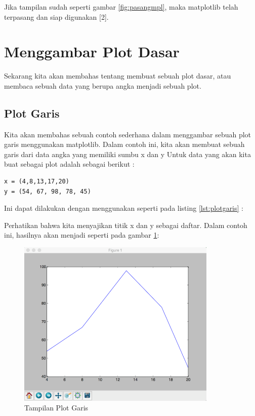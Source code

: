 Jika tampilan sudah seperti gambar \ref{fig:pasangmpl}, maka matplotlib telah terpasang dan siap digunakan [2].

\section{Menggambar Plot Dasar}
Sekarang kita akan membahas tentang membuat sebuah plot dasar, atau membaca sebuah data yang berupa angka menjadi sebuah plot.
\subsection{Plot Garis}
Kita akan membahas sebuah contoh sederhana dalam menggambar sebuah plot garis menggunakan matplotlib. Dalam contoh ini, kita akan membuat sebuah garis dari data angka yang memiliki sumbu x dan y
Untuk data yang akan kita buat sebagai plot adalah sebagai berikut : 
\begin{verbatim}
x = (4,8,13,17,20)
y = (54, 67, 98, 78, 45)
\end{verbatim}

Ini dapat dilakukan dengan menggunakan seperti pada listing \ref{lst:plotgaris} : 

Perhatikan bahwa kita menyajikan titik x dan y sebagai daftar.
Dalam contoh ini, hasilnya akan menjadi seperti pada gambar \ref{fig:plotgaris}:
\begin{figure}[!htbp]
	\centerline{\includegraphics[width=0.85\textwidth]{figures/6/plotgaris.PNG}}
	\caption{Tampilan Plot Garis}
	\label{fig:plotgaris}
\end{figure}

